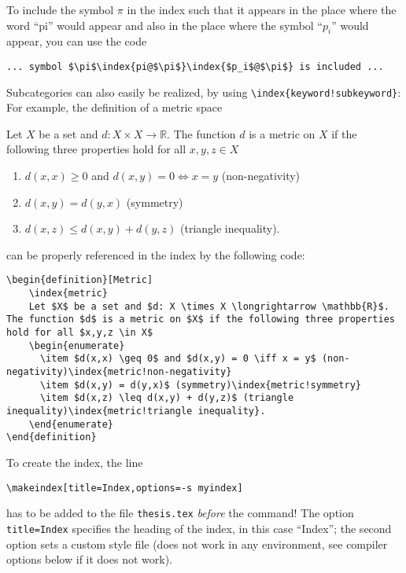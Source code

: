  To include the symbol $\pi$ in the index such that it appears in the place where the word \enquote{pi} would appear and also in the place where the symbol \enquote{$p_i$} would appear, you can use the code
\begin{lstlisting}[language={[LaTeX]TeX}]
  ... symbol $\pi$\index{pi@$\pi$}\index{$p_i$@$\pi$} is included ...
\end{lstlisting}

Subcategories can also easily be realized, by using \verb|\index{keyword!subkeyword}|: For example, the definition of a metric space
\begin{definition}[Metric]
	Let $X$ be a set and $d: X \times X \longrightarrow \mathbb{R}$. The function $d$ is a metric on $X$ if the following three properties hold for all $x,y,z \in X$
	\begin{enumerate}
	  \item $d(x,x) \geq 0$ and $d(x,y) = 0 \iff x = y$ (non-negativity)
	  \item $d(x,y) = d(y,x)$ (symmetry)
	  \item $d(x,z) \leq d(x,y) + d(y,z)$ (triangle inequality).
	\end{enumerate}
\end{definition}
can be properly referenced in the index by the following code:
\begin{lstlisting}[language={[LaTeX]TeX}]
\begin{definition}[Metric]
	\index{metric}
	Let $X$ be a set and $d: X \times X \longrightarrow \mathbb{R}$. The function $d$ is a metric on $X$ if the following three properties hold for all $x,y,z \in X$
	\begin{enumerate}
	  \item $d(x,x) \geq 0$ and $d(x,y) = 0 \iff x = y$ (non-negativity)\index{metric!non-negativity}
	  \item $d(x,y) = d(y,x)$ (symmetry)\index{metric!symmetry}
	  \item $d(x,z) \leq d(x,y) + d(y,z)$ (triangle inequality)\index{metric!triangle inequality}.
	\end{enumerate}
\end{definition}
\end{lstlisting}

To create the index, the line 
\begin{lstlisting}[language={[LaTeX]TeX}]
	\makeindex[title=Index,options=-s myindex]
\end{lstlisting}
has to be added to the file \verb|thesis.tex| \emph{before} the \verb|| command! The option \verb|title=Index| specifies the heading of the index, in this case \enquote{Index}; the second option sets a custom style file (does not work in any environment, see compiler options below if it does not work).

